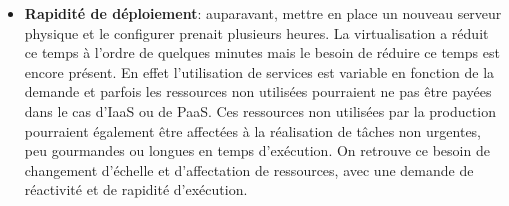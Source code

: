 \begin{itemize}
        \item \textbf{Rapidité de déploiement}: auparavant, mettre en place un nouveau serveur physique et le configurer prenait plusieurs heures. La virtualisation a réduit ce temps à l'ordre de quelques minutes mais le besoin de réduire ce temps est encore présent. En effet l'utilisation de services est variable en fonction de la demande et parfois les ressources non utilisées pourraient ne pas être payées dans le cas d'IaaS ou de PaaS. Ces ressources non utilisées par la production pourraient également être affectées à la réalisation de tâches non urgentes, peu gourmandes ou longues en temps d'exécution. On retrouve ce besoin de changement d'échelle et d'affectation de ressources, avec une demande de réactivité et de rapidité d'exécution.
    \end{itemize}
